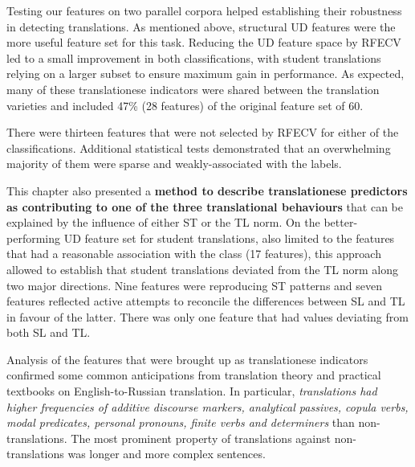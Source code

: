 Testing our features on two parallel corpora helped establishing their robustness in detecting translations. 
As mentioned above, structural UD features were the more useful feature set for this task.
Reducing the UD feature space by RFECV led to a small improvement in both classifications, with student translations relying on a larger subset to ensure maximum gain in performance. As expected, many of these translationese indicators were shared between the translation varieties and included 47\% (28 features) of the original feature set of 60.

There were thirteen features that were not selected by RFECV for either of the classifications. Additional statistical tests demonstrated that an overwhelming majority of them were sparse and weakly-associated with the labels. 

This chapter also presented a \textbf{method to describe translationese predictors as contributing to one of the three translational behaviours} that can be explained by the influence of either ST or the TL norm. On the better-performing UD feature set for student translations, also limited to the features that had a reasonable association with the class (17 features), this approach allowed to establish that student translations deviated from the TL norm along two major directions. Nine features were reproducing ST patterns and seven features reflected active attempts to reconcile the differences between SL and TL in favour of the latter. 
There was only one feature that had values deviating from both SL and TL. 

Analysis of the features that were brought up as translationese indicators confirmed some common anticipations from translation theory and practical textbooks on English-to-Russian translation. In particular, \textit{translations had higher frequencies of additive discourse markers, analytical passives, copula verbs, modal predicates, personal pronouns, finite verbs and determiners} than non-translations. The most prominent property of translations against non-translations was longer and more complex sentences. 

